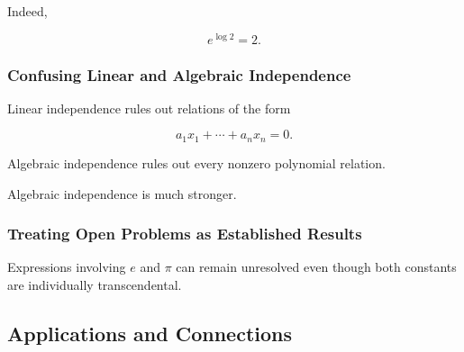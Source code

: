 Indeed,

\[ e^{\log2}=2. \]

\subsubsection{Confusing Linear and Algebraic Independence}

Linear independence rules out relations of the form

\[ a_1x_1+\cdots+a_nx_n=0. \]

Algebraic independence rules out every nonzero polynomial relation.

Algebraic independence is much stronger.

\subsubsection{Treating Open Problems as Established Results}

Expressions involving \(e\) and \(\pi\) can remain unresolved even though
both constants are individually transcendental.

\subsection{Applications and Connections}
\label{subsec:transcendental-number-theory-applications}

